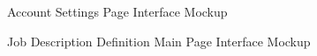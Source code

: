 \begin{figure}[H]
    \centering
    \caption{ Account Settings Page Interface Mockup }
    \label{fig:Account-Settings-Page-Interface-Mockup}
\end{figure}

\begin{figure}[H]
    \centering
    \caption{ Job Description Definition Main Page Interface Mockup }
    \label{fig:Job-Description-Definition-Main-Page-Interface-Mockup}
\end{figure}


